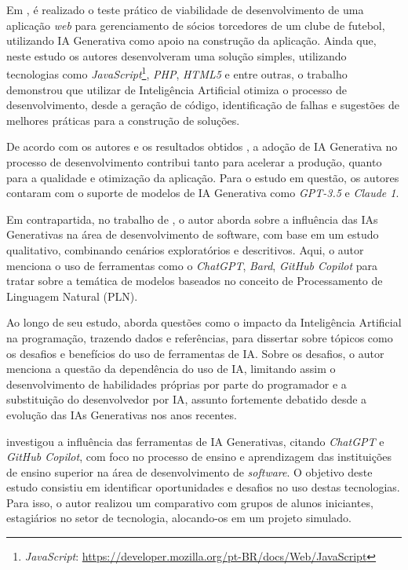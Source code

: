 \documentclass[english,brazilian]{UNISINOSartigo} %
\begin{document}
Em , é realizado o teste prático de viabilidade de desenvolvimento de uma aplicação \textit{web} para gerenciamento de sócios torcedores de um clube de futebol, utilizando IA Generativa como apoio na construção da aplicação. Ainda que, neste estudo os autores desenvolveram uma solução simples, utilizando tecnologias como \textit{JavaScript}\footnote{\textit{JavaScript}: \url{https://developer.mozilla.org/pt-BR/docs/Web/JavaScript}}, \textit{PHP}, \textit{HTML5} e entre outras, o trabalho demonstrou que utilizar de Inteligência Artificial otimiza o processo de desenvolvimento, desde a geração de código, identificação de falhas e sugestões de melhores práticas para a construção de soluções.

De acordo com os autores e os resultados obtidos \cite{daSilva2025}, a adoção de IA Generativa no processo de desenvolvimento contribui tanto para acelerar a produção, quanto para a qualidade e otimização da aplicação. Para o estudo em questão, os autores contaram com o suporte de modelos de IA Generativa como \textit{GPT-3.5} e \textit{Claude 1}.

Em contrapartida, no trabalho de , o autor aborda sobre a influência das IAs Generativas na área de desenvolvimento de software, com base em um estudo qualitativo, combinando cenários exploratórios e descritivos. Aqui, o autor menciona o uso de ferramentas como o \textit{ChatGPT}, \textit{Bard}, \textit{GitHub Copilot} para tratar sobre a temática de modelos baseados no conceito de Processamento de Linguagem Natural (PLN).

Ao longo de seu estudo,  aborda questões como o impacto da Inteligência Artificial na programação, trazendo dados e referências, para dissertar sobre tópicos como os desafios e benefícios do uso de ferramentas de IA. Sobre os desafios, o autor menciona a questão da dependência do uso de IA, limitando assim o desenvolvimento de habilidades próprias por parte do programador e a substituição do desenvolvedor por IA, assunto fortemente debatido desde a evolução das IAs Generativas nos anos recentes. 

 investigou a influência das ferramentas de IA Generativas, citando \textit{ChatGPT} e \textit{GitHub Copilot}, com foco no processo de ensino e aprendizagem das instituições de ensino superior na área de desenvolvimento de \textit{software}. O objetivo deste estudo consistiu em identificar oportunidades e desafios no uso destas tecnologias. Para isso, o autor realizou um comparativo com grupos de alunos iniciantes, estagiários no setor de tecnologia, alocando-os em um projeto simulado.
\end{document}
